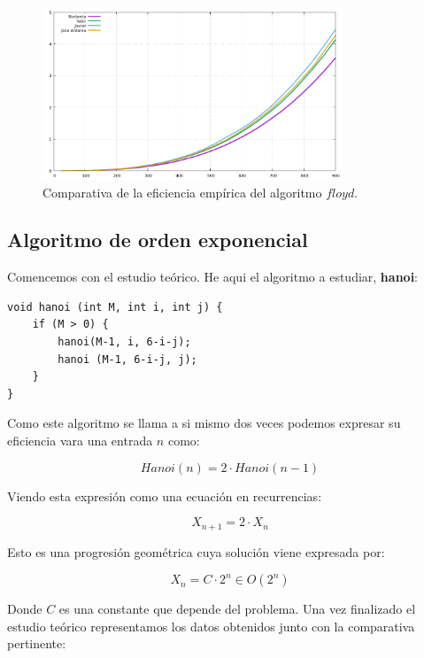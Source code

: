 \documentclass[11pt,a4paper]{article}
\begin{document}
\begin{figure}[H]
	\centering
	\includegraphics[width=0.8\textwidth]{../plots/floyd}
	\caption{Comparativa de la eficiencia empírica del algoritmo $floyd$.}
\end{figure}

\subsection{Algoritmo de orden exponencial}

Comencemos con el estudio teórico. He aqui el algoritmo a estudiar, \textbf{hanoi}:

\begin{lstlisting}
void hanoi (int M, int i, int j) {
	if (M > 0) {
		hanoi(M-1, i, 6-i-j);
		hanoi (M-1, 6-i-j, j);
	}
}	     	
\end{lstlisting}

Como este algoritmo se llama a si mismo dos veces podemos expresar su eficiencia vara una entrada $n$ como:

$$Hanoi(n) = 2 \cdot Hanoi(n-1)$$

Viendo esta expresión como una ecuación en recurrencias:

$$X_{n+1} = 2 \cdot X_n$$

Esto es una progresión geométrica cuya solución viene expresada por:

$$X_n = C \cdot 2^n \in O(2^n)$$

Donde $C$ es una constante que depende del problema. Una vez finalizado el estudio teórico representamos los datos obtenidos junto con la comparativa pertinente:
\end{document}
